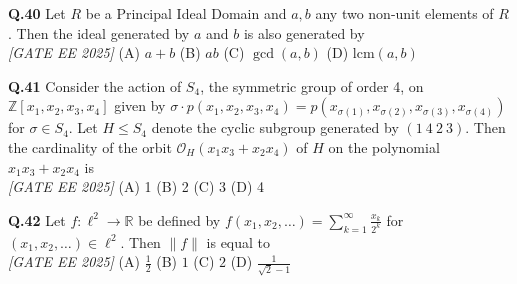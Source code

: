\documentclass[11pt]{article}
\begin{document}
\begin{flushleft}
\textbf{Q.40} Let $R$ be a Principal Ideal Domain and $a, b$ any two non-unit elements of $R$. Then the ideal generated by $a$ and $b$ is also generated by 
\\[1ex] \textit{[GATE EE 2025]}
\newline
(A) $a + b$ \hspace{3em} (B) $ab$ \hspace{3em} (C) $\gcd(a, b)$ \hspace{3em} (D) $\mathrm{lcm}(a, b)$ \newline
\end{flushleft}

\begin{flushleft}
\textbf{Q.41} Consider the action of $S_4$, the symmetric group of order 4, on $\mathbb{Z}[x_{1}, x_{2}, x_{3}, x_{4}]$ given by \newline
\hspace*{2em} $\sigma \cdot p(x_1, x_2, x_3, x_4) = p(x_{\sigma(1)}, x_{\sigma(2)}, x_{\sigma(3)}, x_{\sigma(4)})$ for $\sigma \in S_4$. \newline
Let $H \leq S_4$ denote the cyclic subgroup generated by $(1\ 4\ 2\ 3)$. Then the cardinality of the orbit \newline
\hspace*{2em} $\mathcal{O}_H(x_1 x_3 + x_2 x_4)$ of $H$ on the polynomial $x_1 x_3 + x_2 x_4$ is 
\\[1ex] \textit{[GATE EE 2025]}
\newline
(A) 1 \hspace{3em} (B) 2 \hspace{3em} (C) 3 \hspace{3em} (D) 4 \newline
\end{flushleft}

\begin{flushleft}
\textbf{Q.42} Let $f : \ell^2 \to \mathbb{R}$ be defined by $f(x_1, x_2, \dots) = \sum \limits_{k=1}^{\infty} \frac{x_k}{2^k}$ for $(x_1, x_2, \dots) \in \ell^2$. Then $\|f\|$ is equal to
\\[1ex] \textit{[GATE EE 2025]}
\newline
(A) $\frac{1}{2}$ \hspace{3em} (B) $1$ \hspace{3em} (C) $2$ \hspace{3em} (D) $\frac{1}{\sqrt{2} - 1}$ \newline
\end{flushleft}
\end{document}
